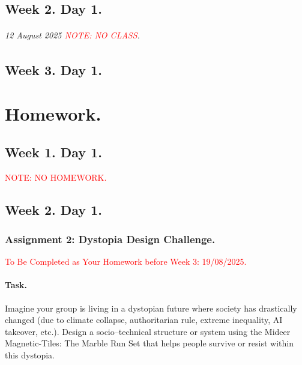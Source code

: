 \documentclass[11pt]{book}
\begin{document}
	\chapter{Week 2. Day 1.}
			\paragraph{12 August 2025 \textcolor{red}{NOTE: NO CLASS}.}
	
			
	\chapter{Week 3. Day 1.}
	
\part{Homework.}


	\chapter{Week 1. Day 1.}
				\textcolor{red}{NOTE: NO HOMEWORK.}

	\chapter{Week 2. Day 1.}	
			\section{Assignment 2: Dystopia Design Challenge.}
				\textcolor{red}{To Be Completed as Your Homework before Week 3: 19/08/2025.}
			\subsection{Task.}
				Imagine your group is living in a dystopian future where society has drastically changed (due to climate collapse, authoritarian rule, extreme inequality, AI takeover, etc.). Design a socio–technical structure or system using the Mideer Magnetic-Tiles: The Marble Run Set that helps people survive or resist within this dystopia.
				
\end{document}
